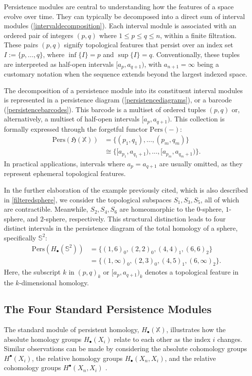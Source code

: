 Persistence modules are central to understanding how the features of a space evolve over time. They can typically be decomposed into a direct sum of interval modules (\ref{intervaldecomposition}). Each interval module is associated with an ordered pair of integers $(p,q)$ where $1 \leq p \leq q \leq n$, within a finite filtration. These pairs $(p,q)$ signify topological features that persist over an index set $I := \{p, \ldots, q\}$, where $\inf\{I\} = p$ and $\sup\{I\} = q$. Conventionally, these tuples are interpreted as half-open intervals $[a_p, a_{q+1})$, with $a_{n+1} = \infty$ being a customary notation when the sequence extends beyond the largest indexed space.

The decomposition of a persistence module into its constituent interval modules is represented in a persistence diagram (\ref{persistencediagrams}), or a barcode (\ref{persistencebarcodes}). This barcode is a multiset of ordered tuples $(p,q)$ or, alternatively, a multiset of half-open intervals $[a_p, a_{q+1})$. This collection is formally expressed through the forgetful functor $\text{Pers}(-)$:
\begin{align}
\text{Pers}(\mathfrak{H}(\mathbb{X})) &= \{(p_1,q_1), \ldots, (p_m,q_m)\} \\
&\cong \{[a_{p_1}, a_{q_1+1}), \ldots, [a_{p_m}, a_{q_m+1})\}.
\end{align}
In practical applications, intervals where $a_p = a_{q+1}$ are usually omitted, as they represent ephemeral topological features.

\begin{example}
In the further elaboration of the example previously cited, which is also described in \ref{filteredsphere}, we consider the topological subspaces $S_1, S_3, S_5$, all of which are contractible. Meanwhile, $S_2, S_4, S_6$ are homeomorphic to the $0$-sphere, $1$-sphere, and $2$-sphere, respectively. This structural distinction leads to four distinct intervals in the persistence diagram of the total homology of a sphere, specifically $\mathbb{S}^2$:
\begin{align}
\text{Pers}(H_\bullet(\mathbb{S}^2)) &= \{(1,6)_0, (2,2)_0, (4,4)_1, (6,6)_2 \} \\
&= \{(1,\infty)_0, (2,3)_0, (4,5)_1, (6, \infty)_2 \}.
\end{align}
Here, the subscript $k$ in $(p,q)_k$ or $[a_p, a_{q+1})_k$ denotes a topological feature in the $k$-dimensional homology.
\end{example}

\subsection{The Four Standard Persistence Modules}
\label{standardpersistencemodules}
The standard module of persistent homology, \( H_\bullet(\mathbb{X}) \), illustrates how the absolute homology groups \( H_\bullet(X_i) \) relate to each other as the index \( i \) changes. Similar observations can be made by considering the absolute cohomology groups \( H^\bullet(X_i) \), the relative homology groups \( H_\bullet(X_n, X_i) \), and the relative cohomology groups \( H^\bullet(X_n, X_i) \) \cite[§2.4]{de2011dualities}.

